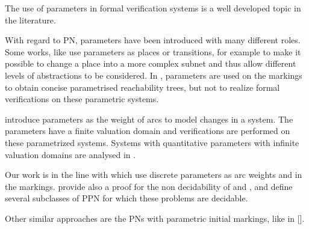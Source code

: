 The use of parameters in formal verification systems is a well developed topic in the literature.

With regard to \ac{PN}, parameters have been introduced with many different roles.
Some works, like \cite{Christensen97} use parameters as places or transitions, for example to make it possible to change a place into a more complex subnet and thus allow different levels of abstractions to be considered.
In \cite{Lindqvist91}, parameters are used on the markings to obtain concise parametrised reachability trees, but not to realize formal verifications on these parametric systems.

\cite{Badouel99} introduce parameters as the weight of arcs to model changes in a system.
The parameters have a finite valuation domain and verifications are performed on these parametrized systems.
Systems with quantitative parameters with infinite valuation domains are analysed in \cite{Abdulla13}.

Our work is in the line with \cite{David17} which use discrete parameters as arc weights and in the markings.
\cite{David17} provide also a proof for the non decidability of \Ucov and \Ecov, and define several subclasses of \ac{PPN} for which these problems are decidable.

Other similar approaches are the \acp{PN} with parametric initial markings, like in [].


